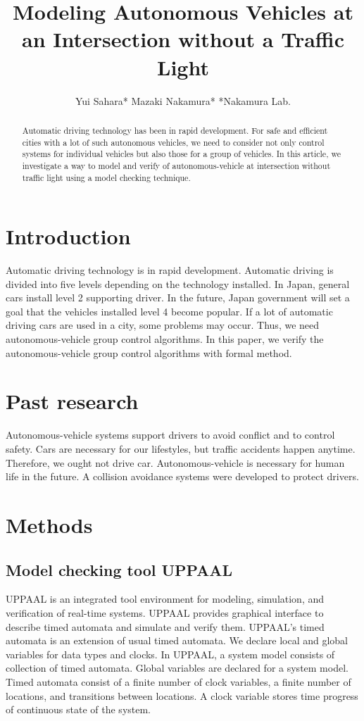 \documentclass[]{article}
\title{Modeling Autonomous Vehicles at an Intersection without a Traffic Light}
\author{Yui Sahara*  Mazaki Nakamura* 	*Nakamura Lab.}
\date{}
\begin{document}
\maketitle
\begin{abstract}
	Automatic driving technology has been in rapid development.  For safe and efficient cities with a lot of such autonomous vehicles, we need to consider not only control systems for individual vehicles but also those for a group of vehicles.  In this article, we investigate a way to model and verify of autonomous-vehicle at intersection without traffic light using a model checking technique.
\end{abstract}

\section{Introduction}
	  Automatic driving technology is in rapid development.  Automatic driving is divided into five levels depending on the technology installed.  In Japan, general cars install level 2 supporting driver.  In the future,  Japan government will set a goal that the vehicles installed level 4 become popular.  If a lot of automatic driving cars are used in a city, some problems may occur.  Thus, we need autonomous-vehicle group control algorithms.  In this paper, we verify the autonomous-vehicle group control algorithms with formal method.
\section{Past research}
	Autonomous-vehicle systems support drivers to avoid conflict and to control safety.  Cars are necessary for our lifestyles, but traffic accidents happen anytime.  Therefore, we ought not drive car.  Autonomous-vehicle is necessary for human life in the future.  A collision avoidance systems were developed to protect drivers. 
\section{Methods}
	\subsection{Model checking tool UPPAAL}
		UPPAAL \cite{u1} is an integrated tool environment for modeling, simulation, and verification of real-time systems.  UPPAAL provides graphical interface to describe timed automata and simulate and verify them. UPPAAL's timed automata is an extension of usual timed automata.  We declare local and global variables for data types and clocks. In UPPAAL, a system model consists of collection of timed automata.  Global variables are declared for a system model. Timed automata \cite{u2} consist of a finite number of clock variables, a finite number of locations, and transitions between locations.  A clock variable stores time progress of continuous state of the system.
\end{document}
